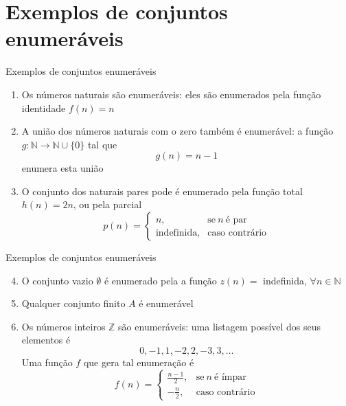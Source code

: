 \section{Exemplos de conjuntos enumeráveis}

\begin{frame}[fragile]{Exemplos de conjuntos enumeráveis}

    \begin{enumerate}
        \item Os números naturais são enumeráveis: eles são enumerados pela função identidade
            $f(n) = n$

        \item A união dos números naturais com o zero também é enumerável: a função 
            $g:\mathbb{N}\to \mathbb{N}\cup \lbrace 0\rbrace$ tal que
            \[
                g(n) = n - 1
            \]
            enumera esta união

        \item O conjunto dos naturais pares pode é enumerado pela função total $h(n) = 2n$, ou
            pela parcial
            \[
                p(n) = \left\lbrace \begin{array}{ll}
                            n, & \mbox{se}\ n\ \mbox{é par} \\
                            \mbox{indefinida}, & \mbox{caso contrário}
                        \end{array}\right.
            \]
    \end{enumerate}

\end{frame}

\begin{frame}[fragile]{Exemplos de conjuntos enumeráveis}

    \begin{enumerate}
        \setcounter{enumi}{3}
        \item O conjunto vazio $\emptyset$ é enumerado pela a função $z(n) =$ indefinida,
            $\forall n\in \mathbb{N}$ 

        \item Qualquer conjunto finito $A$ é enumerável

        \item Os números inteiros $\mathbb{Z}$ são enumeráveis: uma listagem possível dos seus
        elementos é
        \[
            0, -1, 1, -2, 2, -3, 3, \ldots
        \]
        Uma função $f$ que gera tal enumeração é 
        \[
            f(n) = \left\lbrace \begin{array}{ll}
                        \frac{n - 1}{2}, & \mbox{se}\ n\ \mbox{é ímpar} \\
                        -\frac{n}{2}, & \mbox{caso contrário}
                    \end{array}\right.
        \]

    \end{enumerate}

\end{frame}

